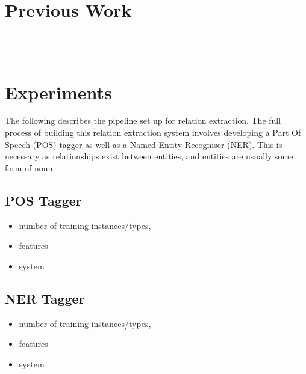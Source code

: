 \documentclass[10pt, a4paper]{article}
\begin{document}

\section{Previous Work}
\\
\\
\section{Experiments}
The following describes the pipeline set up for relation extraction. The full process of building this relation extraction system involves developing a Part Of Speech (POS) tagger as well as a Named Entity Recogniser (NER). This is necessary as relationships exist between entities, and entities are usually some form of noun.
\subsection{POS Tagger}
\begin{itemize}
	\item number of training instances/types,
	\item features 
	\item  system
\end{itemize}
\subsection{NER Tagger}
\begin{itemize}
	\item number of training instances/types,
	\item features 
	\item  system
\end{itemize}
\end{document}

